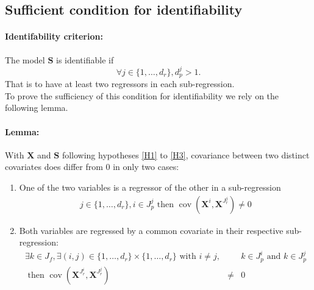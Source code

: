 \documentclass[11pt,a4paper]{article}
\begin{document}
		\subsection{Sufficient condition for identifiability}

\paragraph{Identifability criterion:} The model $\boldsymbol{S}$ is identifiable if
			\begin{equation}
				\forall j \in \{1,\dots,d_r\},  d_p^j>1\label{identcondition}.
			\end{equation}
That is to have at least two regressors in each sub-regression.\\

To prove the sufficiency of this condition for identifiability we rely on the following lemma.

\paragraph{Lemma:} With $\boldsymbol{X}$ and $\boldsymbol{S}$ following hypotheses \ref{H1} to \ref{H3}, covariance between two distinct covariates does differ from $0$ in only two cases:
\begin{enumerate}
	\item One of the two variables is a regressor of the other in a sub-regression	
	\begin{eqnarray}
		j \in \{1,\dots,d_r\}, i \in J_p^j \textrm{ then } \operatorname{cov}(\boldsymbol{X}^{i},\boldsymbol{X}^{J_r^j})\neq 0
	\end{eqnarray}
	\item Both variables are regressed by a common covariate in their respective sub-regression:
	\begin{eqnarray}
		\exists k \in J_f, \exists (i,j)\in \{1,\dots,d_r\}\times \{1,\dots,d_r\} \textrm{ with } i\neq j,&&  k\in J_p^i \textrm{ and } k\in J_p^j \\
		\textrm{ then } \operatorname{cov}(\boldsymbol{X}^{J_r^i},\boldsymbol{X}^{J_r^j})&\neq &0 \nonumber
	\end{eqnarray}
\end{enumerate}
\end{document}
